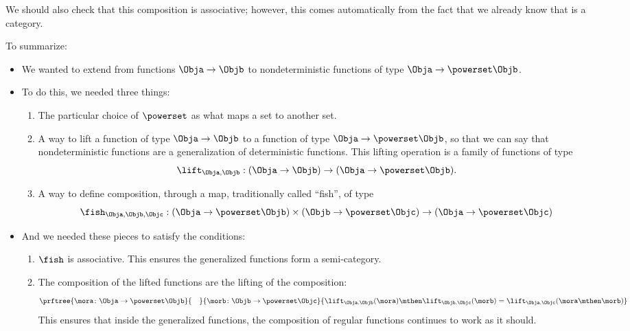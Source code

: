 We should also check that this composition is associative; however, this comes automatically from the fact that we already know that \Rel is a category.

To summarize:
\begin{itemize}
    \item We wanted to extend \Set from functions $\Obja \to \Objb$ to nondeterministic functions of type $\Obja \to \powerset\Objb$.
    \item To do this, we needed three things:
    \begin{enumerate}
        \item The particular choice of $\powerset$ as what maps a set to another set.
        \item A way to lift a function of type $\Obja \to \Objb$ to a function of type $\Obja \to \powerset\Objb$, so that we can say that nondeterministic functions are a generalization of deterministic functions.
This lifting operation is a family of functions of type
        \begin{equation}
            \label{eq:monad-lift}
            \lift_{\Obja, \Objb}: (\Obja \to \Objb) \to (\Obja \to \powerset\Objb).
        \end{equation}
        \item A way to define composition, through a map, traditionally called ``fish'', of type
        \begin{equation}
            \label{eq:monad-fish}
            \fish_{\Obja, \Objb, \Objc}: (\Obja \to \powerset\Objb) \times (\Objb \to \powerset\Objc)
            \to (\Obja \to \powerset \Objc)
        \end{equation}
    \end{enumerate}
    \item And we needed these pieces to satisfy the conditions:
    \begin{enumerate}
        \item $\fish$ is associative.
This ensures the generalized functions form a semi-category.
        \item The composition of the lifted functions are the lifting of the composition:
        \begin{equation}
            \label{eq:monad-fish-associative}
            \prftree{\mora\colon \Obja \to \powerset\Objb}{\quad}{\morb\colon \Objb \to \powerset \Objc}{
                \lift_{\Obja,\Objb}(\mora)\mthen\lift_{\Objb,\Objc}(\morb) =  \lift_{\Obja,\Objc}(\mora\mthen\morb)}
        \end{equation}
        This ensures that inside the generalized functions, the composition of regular functions continues to work as it should.
    \end{enumerate}
\end{itemize}

